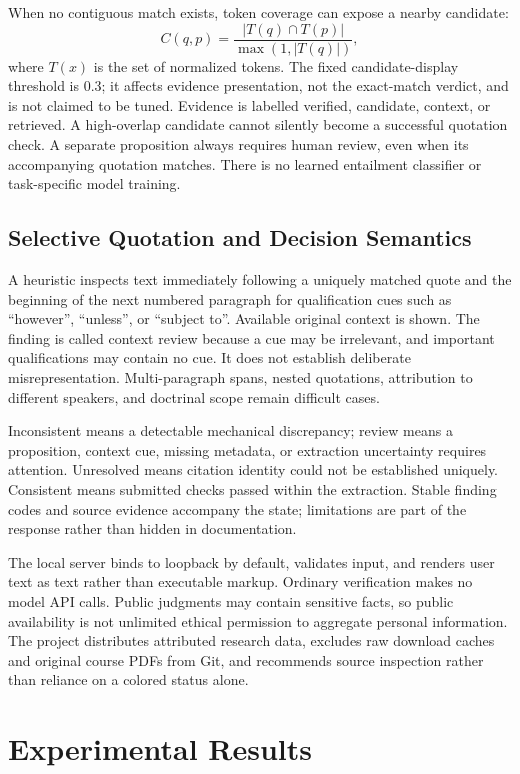 \documentclass[conference]{IEEEtran}
\begin{document}
When no contiguous match exists, token coverage can expose a nearby candidate:
\begin{equation}
C(q,p)=\frac{|T(q)\cap T(p)|}{\max(1,|T(q)|)},
\end{equation}
where $T(x)$ is the set of normalized tokens. The fixed candidate-display threshold is 0.3; it affects evidence presentation, not the exact-match verdict, and is not claimed to be tuned. Evidence is labelled verified, candidate, context, or retrieved. A high-overlap candidate cannot silently become a successful quotation check. A separate proposition always requires human review, even when its accompanying quotation matches. There is no learned entailment classifier or task-specific model training.

\subsection{Selective Quotation and Decision Semantics}
A heuristic inspects text immediately following a uniquely matched quote and the beginning of the next numbered paragraph for qualification cues such as ``however'', ``unless'', or ``subject to''. Available original context is shown. The finding is called context review because a cue may be irrelevant, and important qualifications may contain no cue. It does not establish deliberate misrepresentation. Multi-paragraph spans, nested quotations, attribution to different speakers, and doctrinal scope remain difficult cases.

Inconsistent means a detectable mechanical discrepancy; review means a proposition, context cue, missing metadata, or extraction uncertainty requires attention. Unresolved means citation identity could not be established uniquely. Consistent means submitted checks passed within the extraction. Stable finding codes and source evidence accompany the state; limitations are part of the response rather than hidden in documentation.

The local server binds to loopback by default, validates input, and renders user text as text rather than executable markup. Ordinary verification makes no model API calls. Public judgments may contain sensitive facts, so public availability is not unlimited ethical permission to aggregate personal information. The project distributes attributed research data, excludes raw download caches and original course PDFs from Git, and recommends source inspection rather than reliance on a colored status alone.

\section{Experimental Results}
\end{document}
